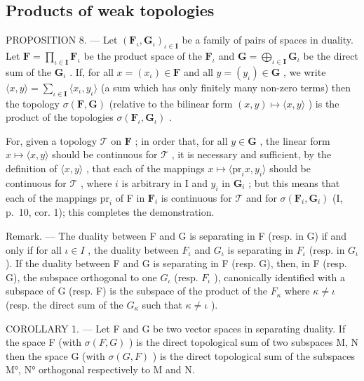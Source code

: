 \subsection{Products of weak topologies}

PROPOSITION 8. --- Let \((\mathbf{F}_{\iota}, \mathbf{G}_{\iota})_{\iota \in \mathbf{I}}\) be a family of pairs of spaces in duality. Let \(\mathbf{F} = \prod_{\iota \in \mathbf{I}} \mathbf{F}_{\iota}\) be the product space of the \(\mathbf{F}_{\iota}\) and \(\mathbf{G} = \bigoplus_{\iota \in \mathbf{I}} \mathbf{G}_{\iota}\) be the direct sum of the \(\mathbf{G}_{\iota}\) . If, for all \(x = (x_{\iota}) \in \mathbf{F}\) and all \(y = (y_{\iota}) \in \mathbf{G}\) , we write \(\langle x, y \rangle = \sum_{\iota \in \mathbf{I}} \langle x_{\iota}, y_{\iota} \rangle\) (a sum which has only finitely many non-zero terms) then the topology \(\sigma(\mathbf{F}, \mathbf{G})\) (relative to the bilinear form \((x, y) \mapsto \langle x, y \rangle\) ) is the product of the topologies \(\sigma(\mathbf{F}_{\iota}, \mathbf{G}_{\iota})\) .

For, given a topology \(\mathcal{T}\) on \(\mathbf{F}\) ; in order that, for all \(y \in \mathbf{G}\) , the linear form \(x \mapsto \langle x, y \rangle\) should be continuous for \(\mathcal{T}\) , it is necessary and sufficient, by the definition of \(\langle x, y \rangle\) , that each of the mappings \(x \mapsto \langle \mathrm{pr}_i x, y_i \rangle\) should be continuous for \(\mathcal{T}\) , where \(i\) is arbitrary in I and \(y_i\) in \(\mathbf{G}_i\) ; but this means that each of the mappings \(\mathrm{pr}_i\) of F in \(\mathbf{F}_i\) is continuous for \(\mathcal{T}\) and for \(\sigma(\mathbf{F}_i, \mathbf{G}_i)\) (I, p.~10, cor. 1); this completes the demonstration.

Remark. --- The duality between F and G is separating in F (resp. in G) if and only if for all \(\iota\in I\) , the duality between \(F_{\iota}\) and \(G_{\iota}\) is separating in \(F_{\iota}\) (resp. in \(G_{\iota}\) ). If the duality between F and G is separating in F (resp. G), then, in F (resp. G), the subspace orthogonal to one \(G_{\iota}\) (resp. \(F_{\iota}\) ), canonically identified with a subspace of G (resp. F) is the subspace of the product of the \(F_{\kappa}\) where \(\kappa\neq\iota\) (resp. the direct sum of the \(G_{\kappa}\) such that \(\kappa\neq\iota\) ).

COROLLARY 1. --- Let F and G be two vector spaces in separating duality. If the space F (with \(\sigma(F, G)\) ) is the direct topological sum of two subspaces M, N then the space G (with \(\sigma(G, F)\) ) is the direct topological sum of the subspaces M°, N° orthogonal respectively to M and N.

